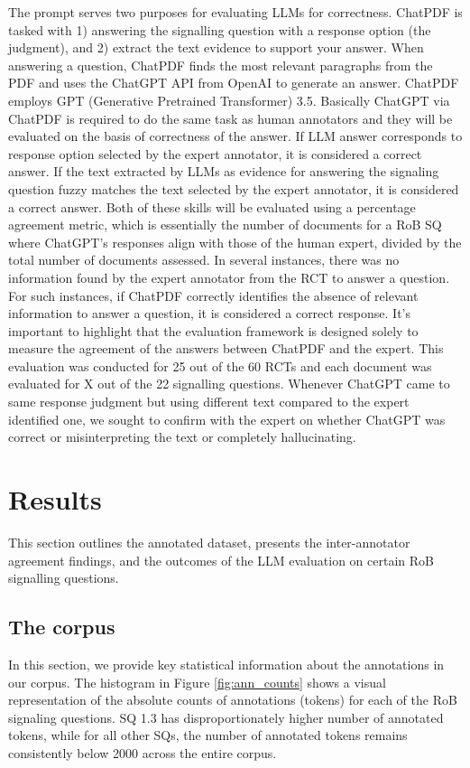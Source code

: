 \documentclass[sn-mathphys,Numbered]{sn-jnl}%
\theoremstyle{thmstyleone}%
\theoremstyle{thmstyletwo}%
\theoremstyle{thmstylethree}%
\begin{document}
The prompt serves two purposes for evaluating LLMs for correctness.
ChatPDF is tasked with 1) answering the signalling question with a response option (the judgment), and 2) extract the text evidence to support your answer.
When answering a question, ChatPDF finds the most relevant paragraphs from the PDF and uses the ChatGPT API from OpenAI to generate an answer.
ChatPDF employs GPT (Generative Pretrained Transformer) 3.5.
Basically ChatGPT via ChatPDF is required to do the same task as human annotators and they will be evaluated on the basis of correctness of the answer.
If LLM answer corresponds to response option selected by the expert annotator, it is considered a correct answer. 
If the text extracted by LLMs as evidence for answering the signaling question fuzzy matches the text selected by the expert annotator, it is considered a correct answer.
Both of these skills will be evaluated using a percentage agreement metric, which is essentially the number of documents for a RoB SQ where ChatGPT's responses align with those of the human expert, divided by the total number of documents assessed.
In several instances, there was no information found by the expert annotator from the RCT to answer a question. 
For such instances, if ChatPDF correctly identifies the absence of relevant information to answer a question, it is considered a correct response.
It's important to highlight that the evaluation framework is designed solely to measure the agreement of the answers between ChatPDF and the expert.
This evaluation was conducted for 25 out of the 60 RCTs and each document was evaluated for X out of the 22 signalling questions. %
Whenever ChatGPT came to same response judgment but using different text compared to the expert identified one, we sought to confirm with the expert on whether ChatGPT was correct or misinterpreting the text or completely hallucinating.
%
%
%
\section{Results}
\label{sec:results}
%
This section outlines the annotated dataset, presents the inter-annotator agreement findings, and the outcomes of the LLM evaluation on certain RoB signalling questions.
%
%
%
\subsection{The corpus}
\label{subsec:corpus}
%
In this section, we provide key statistical information about the annotations in our corpus.
The histogram in Figure \ref{fig:ann_counts} shows a visual representation of the absolute counts of annotations (tokens) for each of the RoB signaling questions.
SQ 1.3 has disproportionately higher number of annotated tokens, while for all other SQs, the number of annotated tokens remains consistently below 2000 across the entire corpus.
\end{document}
